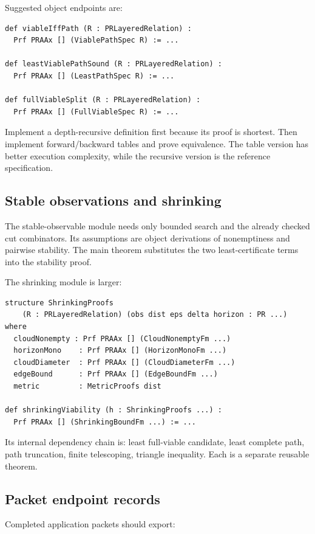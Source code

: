Suggested object endpoints are:
\begin{lstlisting}
def viableIffPath (R : PRLayeredRelation) :
  Prf PRAAx [] (ViablePathSpec R) := ...

def leastViablePathSound (R : PRLayeredRelation) :
  Prf PRAAx [] (LeastPathSpec R) := ...

def fullViableSplit (R : PRLayeredRelation) :
  Prf PRAAx [] (FullViableSpec R) := ...
\end{lstlisting}

Implement a depth-recursive definition first because its proof is shortest.
Then implement forward/backward tables and prove equivalence.  The table version
has better execution complexity, while the recursive version is the reference
specification.

\subsection{Stable observations and shrinking}

The stable-observable module needs only bounded search and the already checked
cut combinators.  Its assumptions are object derivations of nonemptiness and
pairwise stability.  The main theorem substitutes the two least-certificate
terms into the stability proof.

The shrinking module is larger:

\begin{lstlisting}
structure ShrinkingProofs
    (R : PRLayeredRelation) (obs dist eps delta horizon : PR ...) where
  cloudNonempty : Prf PRAAx [] (CloudNonemptyFm ...)
  horizonMono    : Prf PRAAx [] (HorizonMonoFm ...)
  cloudDiameter  : Prf PRAAx [] (CloudDiameterFm ...)
  edgeBound      : Prf PRAAx [] (EdgeBoundFm ...)
  metric         : MetricProofs dist

def shrinkingViability (h : ShrinkingProofs ...) :
  Prf PRAAx [] (ShrinkingBoundFm ...) := ...
\end{lstlisting}

Its internal dependency chain is: least full-viable candidate, least complete
path, path truncation, finite telescoping, triangle inequality.  Each is a
separate reusable theorem.

\subsection{Packet endpoint records}

Completed application packets should export:

